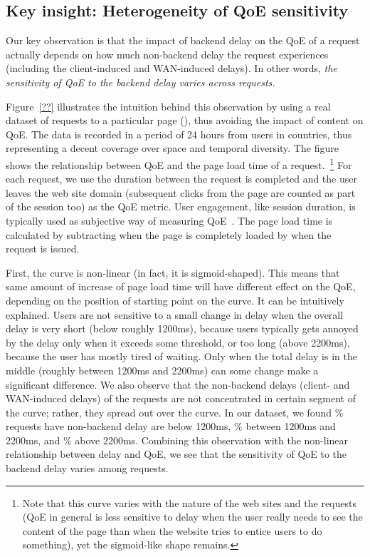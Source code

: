 \subsection{Key insight: Heterogeneity of QoE sensitivity}

Our key observation is that the impact of backend delay on the QoE of a request actually depends on how much non-backend delay the request experiences (including the client-induced and WAN-induced delays). 
In other words, {\em the sensitivity of QoE to the backend delay varies across requests.} 

Figure~\ref{??} illustrates the intuition behind this observation by using a real dataset of \fillme requests to a particular page (\fillme), thus avoiding the impact of content on QoE. The data is recorded in a period of 24 hours from users in \fillme countries, thus representing a decent coverage over space and temporal diversity.
The figure shows the relationship between QoE and the page load time of a request.~\footnote{Note that this curve varies with the nature of the web sites and the requests (\eg QoE in general is less sensitive to delay when the user really needs to see the content of the page than when the website tries to entice users to do something), yet the sigmoid-like shape remains.}
For each request, we use the duration between the request is completed and the user leaves the web site domain (subsequent clicks from the page are counted as part of the session too) as the QoE metric. 
User engagement, like session duration, is typically used as subjective way of measuring QoE~\cite{engagement}.
The page load time is calculated by subtracting when the page is completely loaded by when the request is issued. 

First, the curve is non-linear (in fact, it is sigmoid-shaped). 
This means that same amount of increase of page load time will have different effect on the QoE, depending on the position of starting point on the curve.
It can be intuitively explained. 
Users are not sensitive to a small change in delay when the overall delay is very short (below roughly 1200ms), because users typically gets annoyed by the delay only when it exceeds some threshold, or too long (above 2200ms), because the user has mostly tired of waiting. Only when the total delay is in the middle (roughly between 1200ms and 2200ms) can some change make a significant difference. 
We also observe that the non-backend delays (client- and WAN-induced delays) of the requests are not concentrated in certain segment of the curve; rather, they spread out over the curve.
In our dataset, we found \fillme\% requests have non-backend delay are below 1200ms, \fillme\% between 1200ms and 2200ms, and \fillme\% above 2200ms. 
Combining this observation with the non-linear relationship between delay and QoE, we see that the sensitivity of QoE to the backend delay varies among requests. 



